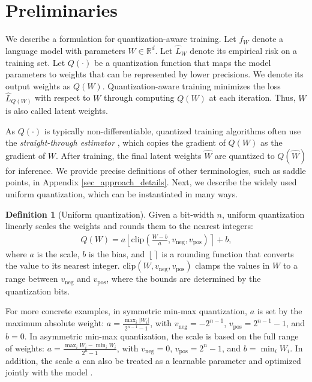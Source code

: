 \documentclass{article}
\theoremstyle{definition}
\newtheorem{definition}[theorem]{Definition}
\newcommand{\round}[1]{\ensuremath{\left \lfloor#1 \right \rceil }}
\begin{document}
\section{Preliminaries}

We describe a formulation for quantization-aware training. 
Let $f_W$ denote a language model with parameters $W \in \mathbb{R}^d$. Let $\hat{L}_W$ denote its empirical risk on a training set. 
Let $Q(\cdot)$ be a quantization function that maps the model parameters to weights that can be represented by lower precisions. We denote its output weights as $Q(W)$. Quantization-aware training minimizes the loss $\hat L_{Q(W)}$ with respect to $W$ through computing $Q(W)$ at each iteration. Thus, $W$ is also called latent weights. 

As $Q(\cdot)$ is typically non-differentiable, quantized training algorithms often use the \emph{straight-through estimator} \citep{bengio2013estimating}, which copies the gradient of $Q(W)$ as the gradient of $W$. After training, the final latent weights $\hat{W}$ are quantized to $Q(\hat{W})$ for inference. We provide precise definitions of other terminologies, such as saddle points, in Appendix \ref{sec_approach_details}. 
Next, we describe the widely used uniform quantization, which can be instantiated in many ways.    


\begin{definition}[Uniform quantization]
Given a bit-width $n$, uniform quantization linearly scales the weights and rounds them to the nearest integers:
\begin{align}
    Q(W) = a \round{ \text{clip} \left ( \frac{W - b}{a}, v_{\text{neg}}, v_{\text{pos}} \right ) } + b,
\end{align}
where $a$ is the scale, $b$ is the bias, and $\round{}$ is a rounding function that converts the value to its nearest integer.
$\text{clip}(W, v_{\text{neg}}, v_{\text{pos}})$ clamps the values in $W$ to a range between $v_{\text{neg}}$ and $v_{\text{pos}}$, where the bounds are determined by the quantization bits.  

For more concrete examples, in symmetric min-max quantization, $a$ is set by the maximum absolute weight: $a = \frac{\max_i|W_{i}|}{2^{n-1}-1}$, with $v_{\text{neg}} = - 2^{n-1}$, $v_{\text{pos}} = 2^{n-1} - 1$, and $b=0$. 
In asymmetric min-max quantization, the scale is based on the full range of weights: $a = \frac{\max_i W_{i} - \min_i W_i}{2^{n}-1}$, with $v_{\text{neg}} = 0$, $v_{\text{pos}} = 2^{n} - 1$, and $b=\min_i W_i$.
In addition, the scale $a$ can also be treated as a learnable parameter and optimized jointly with the model \citep{esser2020learned}.
\end{definition}
\end{document}
